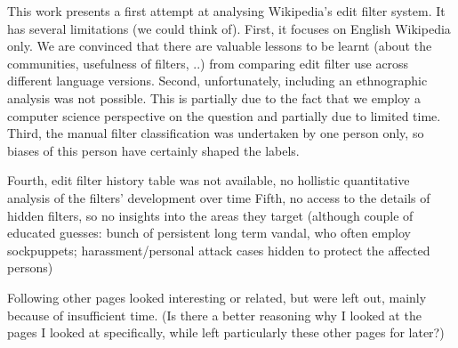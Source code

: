 This work presents a first attempt at analysing Wikipedia's edit filter system.
It has several limitations (we could think of).
First, it focuses on English Wikipedia only.
We are convinced that there are valuable lessons to be learnt (about the communities, usefulness of filters, ..) from comparing edit filter use across different language versions.
Second, unfortunately, including an ethnographic analysis was not possible.
This is partially due to the fact that we employ a computer science perspective on the question and partially due to limited time.
Third, the manual filter classification was undertaken by one person only, so biases of this person have certainly shaped the labels.

Fourth, edit filter history table was not available, no hollistic quantitative analysis of the filters' development over time
Fifth, no access to the details of hidden filters, so no insights into the areas they target (although couple of educated guesses: bunch of persistent long term vandal, who often employ sockpuppets; harassment/personal attack cases hidden to protect the affected persons)


Following other pages looked interesting or related, but were left out, mainly because of insufficient time.
(Is there a better reasoning why I looked at the pages I looked at specifically, while left particularly these other pages for later?)

